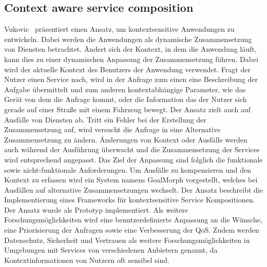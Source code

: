 \documentclass[conference,compsoc]{IEEEtran}
\begin{document}
\subsection{Context aware service composition}
Vukovic~\cite{vukovic2007context} präsentiert einen Ansatz, um kontextsensitive Anwendungen zu entwickeln. Dabei werden die Anwendungen als dynamische Zusammensetzung von Diensten betrachtet. Ändert sich der Kontext, in dem die Anwendung läuft, kann dies zu einer dynamischen Anpassung der Zusammensetzung führen. Dabei wird der aktuelle Kontext des Benutzers der Anwendung verwendet. Fragt der Nutzer einen Service nach, wird in der Anfrage zum einen eine Beschreibung der Aufgabe übermittelt und zum anderen kontextabhängige Parameter, wie das Gerät von dem die Anfrage kommt, oder die Information das der Nutzer sich gerade auf einer Straße mit einem Fahrzeug bewegt.
Der Ansatz zielt auch auf Ausfälle von Diensten ab. Tritt ein Fehler bei der Erstellung der Zusammensetzung auf, wird versucht die Anfrage in eine Alternative Zusammensetzung zu ändern.
Änderungen von Kontext oder Ausfälle werden auch während der Ausführung überwacht und die Zusammensetzung der Services wird entsprechend angepasst.
Das Ziel der Anpassung sind folglich die funktionale sowie nicht-funktionale Anforderungen.
Um Ausfälle zu kompensieren und den Kontext zu erfassen wird ein System namens GoalMorph vorgestellt, welches bei Ausfällen auf alternative Zusammensetzungen wechselt. Der Ansatz beschreibt die Implementierung eines Frameworks für kontextsensitive Service Kompositionen. Der Ansatz wurde als Prototyp implementiert.
Als weitere Forschungsmöglichkeiten wird eine benutzerdefinierte Anpassung an die Wünsche, eine Priorisierung der Anfragen sowie eine Verbesserung der QoS. Zudem werden Datenschutz, Sicherheit und Vertrauen als weitere Forschungsmöglichkeiten in Umgebungen mit Services von verschiedenen Anbietern genannt, da Kontextinformationen von Nutzern oft sensibel sind.
\end{document}
